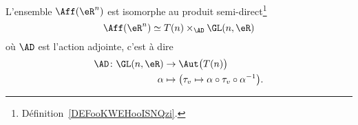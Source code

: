 \begin{proposition}  \label{PROPooTPFZooKtFxhg}
    L'ensemble \( \Aff(\eR^n)\) est isomorphe au produit semi-direct\footnote{Définition~\ref{DEFooKWEHooISNQzi}.}
    \begin{equation}
        \Aff(\eR^n)\simeq  T(n)\times_{\AD}\GL(n,\eR)
    \end{equation}
    où \( \AD\) est l'action adjointe, c'est à dire
    \begin{equation}
        \begin{aligned}
            \AD\colon \GL(n,\eR)&\to \Aut\big( T(n) \big) \\
            \alpha&\mapsto\big( \tau_v\mapsto \alpha\circ\tau_v\circ\alpha^{-1}\big).
        \end{aligned}
    \end{equation}
\end{proposition}

